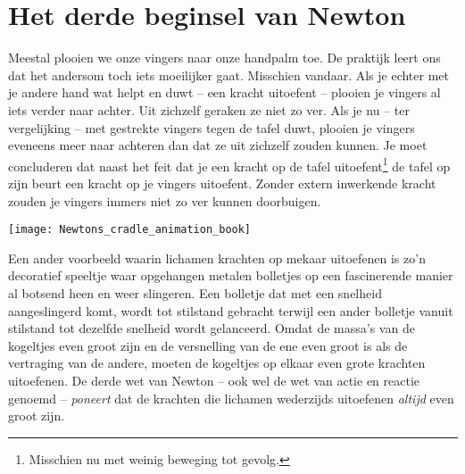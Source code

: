 \documentclass{ximera}
\begin{document}
	\author{Bart Lambregs}
    \xmsource






	\section{Het derde beginsel van Newton}

	Meestal plooien we onze vingers naar onze handpalm toe. De praktijk leert ons dat het andersom toch iets moeilijker gaat. Misschien vandaar. Als je echter met je andere hand wat helpt en duwt -- een kracht uitoefent -- plooien je vingers al iets verder naar achter. Uit zichzelf geraken ze niet zo ver. Als je nu -- ter vergelijking -- met gestrekte vingers tegen de tafel duwt, plooien je vingers eveneens meer naar achteren dan dat ze uit zichzelf zouden kunnen. Je moet concluderen dat naast het feit dat je een kracht op de tafel uitoefent\footnote{Misschien nu met weinig beweging tot gevolg.} de tafel op zijn beurt een kracht op je vingers uitoefent. Zonder extern inwerkende kracht zouden je vingers immers niet zo ver kunnen doorbuigen.

	\begin{image}
	
	\texttt{[image: Newtons\_cradle\_animation\_book]}
	\end{image}

	Een ander voorbeeld waarin lichamen krachten op mekaar uitoefenen is zo'n decoratief speeltje waar opgehangen metalen bolletjes op een fascinerende manier al botsend heen en weer slingeren. Een bolletje dat met een snelheid aangeslingerd komt, wordt tot stilstand gebracht terwijl een ander bolletje vanuit stilstand tot dezelfde snelheid wordt gelanceerd. Omdat de massa's van de kogeltjes even groot zijn en de versnelling van de ene even groot is als de vertraging van de andere, moeten de kogeltjes op elkaar even grote krachten uitoefenen. De derde wet van Newton -- ook wel de wet van actie en reactie genoemd -- \textit{poneert} dat de krachten die lichamen wederzijds uitoefenen \textit{altijd} even groot zijn.
	
\end{document}

